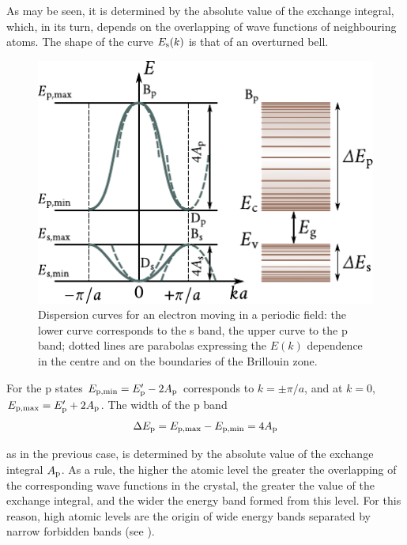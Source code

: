 \noindent
As may be seen, it is determined by the absolute value of the exchange integral, which, in its turn, depends on the overlapping of wave functions of neighbouring atoms. The shape of the curve $E_{\text{s}}(k)$ is that of
an overturned bell.

\begin{figure}[t]
	\begin{center}
		\includegraphics[scale=1]{figures/ch_05/fig_5_10.pdf}
		\caption[]{Dispersion curves for an electron moving in a periodic field: the lower curve corresponds to the s band, the upper curve to the p band; dotted lines are parabolas expressing the $E(k)$ dependence in the centre and on the boundaries of the Brillouin zone.}
		\label{fig:5_10}
	\end{center}
	\vspace{-0.7cm}
\end{figure}

For the p states $E_{\text{p,min}}=E_{\text{p}}'-2A_{\text{p}}$ corresponds to $k=\pm\pi/a$, and at $k=0$, $E_{\text{p,max}}=E_{\text{p}}'+2A_{\text{p}}$. The width of the p band
\begin{equation}\label{eq:5_19}
    \Delta{E_{\text{p}}} = E_{\text{p,max}} - E_{\text{p,min}} = 4 A_{\text{p}}
\end{equation}

\noindent
as in the previous case, is determined by the absolute value of the exchange integral $A_{\text{p}}$. As a rule, the higher the atomic level the greater the overlapping of the corresponding wave functions in the crystal, the greater the value of the exchange integral, and the wider the energy band formed from this level. For this reason, high atomic levels are the origin of wide energy bands separated by narrow forbidden bands (see ).

